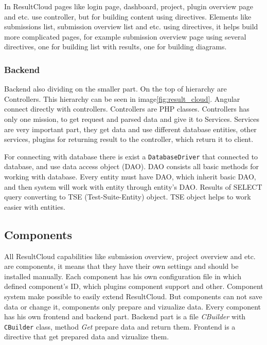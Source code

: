 In ResultCloud pages like login page, dashboard, project, plugin overview page and etc. use controller, but for building content using directives. Elements like submissions list, submission overview list and etc. using directives, it helps build more complicated pages, for example submission overview page using several directives, one for building list with results, one for building diagrams. 

\subsubsection{Backend}

Backend also dividing on the smaller part. On the top of hierarchy are Controllers. This hierarchy can be seen in image\ref{fig:result_cloud}. Angular connect directly with controllers. Controllers are PHP classes. Controllers has only one mission, to get request and parsed data and give it to Services. Services are very important part, they get data and use different database entities, other services, plugins for returning result to the controller, which return it to client.

For connecting with database there is exist a \texttt{DatabaseDriver} that connected to database, and use data access object (DAO). DAO consists all basic methods for working with database. Every entity must have DAO, which inherit basic DAO, and then system will work with entity through entity's DAO. Results of SELECT query converting to TSE (Test-Suite-Entity) object. TSE object helps to work easier with entities.


\subsection{Components}

All ResultCloud capabilities like submission overview, project overview and etc. are components, it means that they have their own settings and should be installed manually. Each component has his own configuration file in which defined component's ID, which plugins component support and other. Component system make possible to easily extend ResultCloud. But components can not save data or change it, components only prepare and vizualize data. Every component has his own frontend and backend part. Backend part is a file \emph{CBuilder} with \texttt{CBuilder} class, method \emph{Get} prepare data and return them. Frontend is a directive that get prepared data and vizualize them.   


